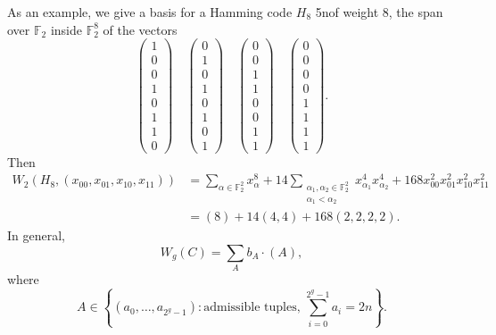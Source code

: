 \documentclass[reqno]{amsart} 
\begin{document}
As an example, we give a basis for a Hamming code $H_8$ 5nof weight $8$, the span over $\mathbb{F}_2$ inside $\mathbb{F}_2^8$ of the vectors
\begin{equation*}
  \begin{pmatrix}
    1 \\ 0 \\ 0 \\ 1 \\ 0 \\ 1 \\ 1 \\ 0
  \end{pmatrix}
  \quad
  \begin{pmatrix}
    0 \\ 1 \\ 0 \\ 1 \\ 0 \\ 1 \\ 0 \\ 1
  \end{pmatrix}
  \quad
  \begin{pmatrix}
    0 \\ 0 \\ 1 \\ 1 \\ 0 \\ 0 \\ 1 \\ 1
  \end{pmatrix}
  \quad
  \begin{pmatrix}
    0 \\ 0 \\ 0 \\ 0 \\ 1 \\ 1 \\ 1 \\ 1
  \end{pmatrix}.
\end{equation*}
Then
\begin{align*}
  W_2(H_8,(x_{00}, x_{01}, x_{10}, x_{11}))
  &= \sum_{\alpha \in \mathbb{F}_2^2}
  x_\alpha^8 + 14
  \sum_{
    \substack{
      \alpha_1, \alpha_2 \in \mathbb{F}_2^2  \\
      \alpha_1 < \alpha_2      
    }
  }
  x_{\alpha_1}^4 x_{\alpha_2}^4
  + 168 x_{00}^2 x_{0 1}^2 x_{10}^2 x_{11}^2
  \\
  &=(8) +
    14(4, 4)
    + 168(2, 2, 2, 2).
\end{align*}
In general,
\begin{equation*}
  W_g(C) = \sum_A b_A \cdot(A),
\end{equation*}
where
\begin{equation*}
  A \in \left\{(a_0, \dotsc, a_{2^g - 1}) : \text{admissible tuples},
    \,
    \sum_{i = 0}^{2^g - 1} a_i = 2 n\right\}.
\end{equation*}
\end{document}
